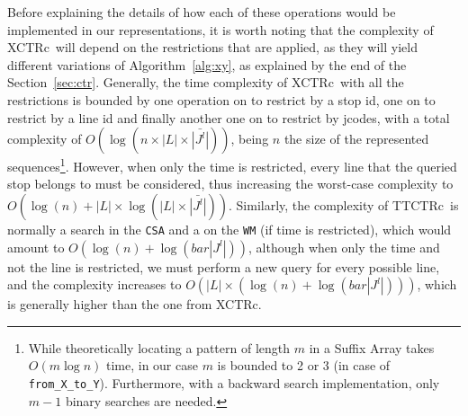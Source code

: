 \documentclass[runningheads]{llncs}
\newcommand{\ctrq}{XCTRc}
\newcommand{\ttctrq}{TTCTRc}
\begin{document}
\medskip
Before explaining the details of how each of these operations would be implemented in our representations, it is worth noting that the complexity of \ctrq~will depend on the restrictions that are applied, as they will yield different variations of Algorithm~\ref{alg:xy}, as explained by the end of the Section~\ref{sec:ctr}. Generally, the time complexity of \ctrq~with all the restrictions is bounded by one  operation on  to restrict by a stop id, one on  to restrict by a line id and finally another one on  to restrict by jcodes, with a total complexity of $O(\log(n\times|L|\times\bar{|J^l|}))$, being $n$ the size of the represented sequences\footnote{While theoretically locating a pattern of length $m$ in a Suffix Array takes $O(m \log n)$ time, in our case $m$ is bounded to 2 or 3 (in case of \texttt{from\_X\_to\_Y}). Furthermore, with a backward search implementation, only $m-1$ binary searches are needed.}.
However, when only the time is restricted, every line that the queried stop belongs to must be considered, thus increasing the worst-case complexity to $O(\log(n) + |L|\times \log(|L|\times\bar{|J^l|}))$. Similarly, the complexity of \ttctrq~is normally a search in the \texttt{CSA} and a  on the \texttt{WM} (if time is restricted), which would amount to $O(\log(n) + \log(bar{|J^l|}))$, although when only the time and not the line is restricted, we must perform a new query for every possible line, and the complexity increases to $O(|L|\times (\log(n) + \log(bar{|J^l|})))$, which is generally higher than the one from \ctrq.
\end{document}
